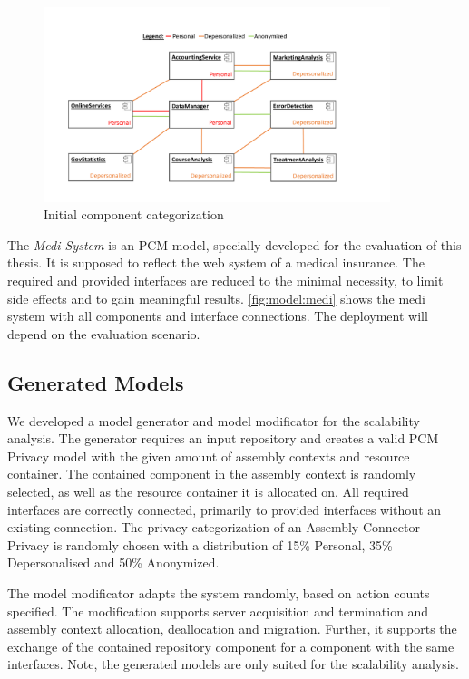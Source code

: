 \begin{figure}[h]
	\centering
	\includegraphics[trim = 0mm 10mm 0mm 20mm, clip, width=0.90\textwidth]{graphs/medSystem_noserver}
	\caption{Initial component categorization}
	\label{fig:model:medi}
\end{figure}

The \textit{Medi System} is an PCM model, specially developed for the evaluation of this thesis. It is supposed to reflect the web system of a medical insurance. The required and provided interfaces are reduced to the minimal necessity, to limit side effects and to gain meaningful results. \autoref{fig:model:medi} shows the medi system with all components and interface connections. The deployment will depend on the evaluation scenario.


\subsection{Generated Models}
\label{sec:Evaluation:models:generated}

We developed a model generator and model modificator for the scalability analysis. The generator requires an input repository and creates a valid PCM Privacy model with the given amount of assembly contexts and resource container. The contained component in the assembly context is randomly selected, as well as the resource container it is allocated on. All required interfaces are correctly connected, primarily to provided interfaces without an existing connection. The privacy categorization of an Assembly Connector Privacy is randomly chosen with a distribution of 15\% Personal, 35\% Depersonalised and 50\% Anonymized.

The model modificator adapts the system randomly, based on action counts specified. The modification supports server acquisition and termination and assembly context allocation, deallocation and migration. Further, it supports the exchange of the contained repository component for a component with the same interfaces. Note, the generated models are only suited for the scalability analysis. 



